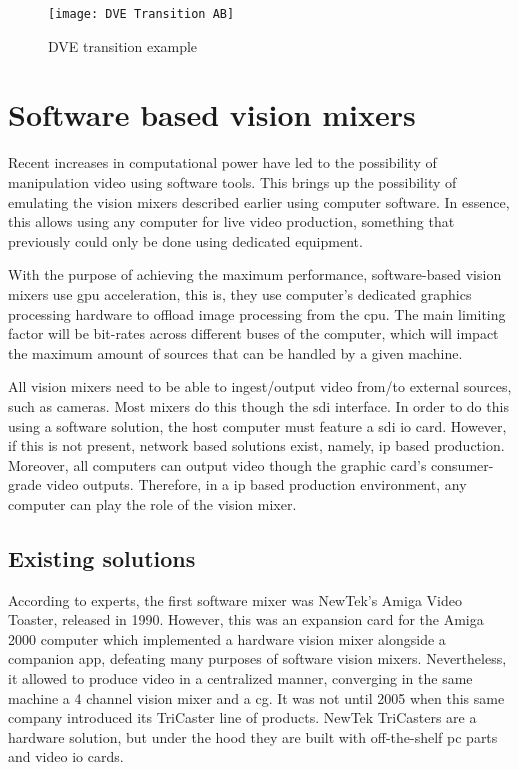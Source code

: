 \documentclass[../main.tex]{subfiles}
\begin{document}
\begin{figure}[htbp]
    \centering
    \texttt{[image: DVE Transition AB]}
    \caption{DVE transition example}
    \label{fig:02:dve_transition_example}
\end{figure}

\section{Software based vision mixers}
Recent increases in computational power have led to the possibility of manipulation video using software tools. This brings up the possibility of emulating the vision mixers described earlier using computer software. In essence, this allows using any computer for live video production, something that previously could only be done using dedicated equipment\cite{wikiSoftware_vision_mixer}.\newline

With the purpose of achieving the maximum performance, software-based vision mixers use \gls{gpu} acceleration, this is, they use computer's dedicated graphics processing hardware to offload image processing from the \gls{cpu}. The main limiting factor will be bit-rates across different buses of the computer, which will impact the maximum amount of sources that can be handled by a given machine.\newline

All vision mixers need to be able to ingest/output video from/to external sources, such as cameras. Most mixers do this though the \gls{sdi} interface. In order to do this using a software solution, the host computer must feature a \gls{sdi} \gls{io} card. However, if this is not present, network based solutions exist, namely, \gls{ip} based production. Moreover, all computers can output video though the graphic card's consumer-grade video outputs. Therefore, in a \gls{ip} based production environment, any computer can play the role of the vision mixer.\newline



\subsection{Existing solutions}
According to experts, the first software mixer was NewTek's Amiga Video Toaster, released in 1990. However, this was an expansion card for the Amiga 2000 computer which implemented a hardware vision mixer alongside a companion app, defeating many purposes of software vision mixers. Nevertheless, it allowed to produce video in a centralized manner, converging in the same machine a 4 channel vision mixer and a \gls{cg}. It was not until 2005 when this same company introduced its TriCaster line of products\cite{neoteoAmigaVideoToaster}. NewTek TriCasters are a hardware solution, but under the hood they are built with off-the-shelf \gls{pc} parts and video \gls{io} cards.\newline
\end{document}
